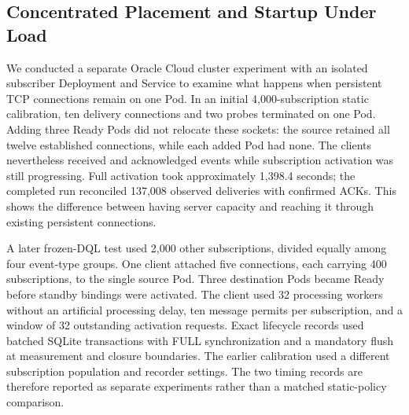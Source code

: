 \subsection{Concentrated Placement and Startup Under Load}
\label{sec:mumbai-startup}

We conducted a separate Oracle Cloud cluster experiment with an isolated subscriber
Deployment and Service to examine what happens when persistent TCP connections remain on one Pod. In an initial 4,000-subscription static calibration, ten delivery
connections and two probes terminated on one Pod. Adding three Ready Pods did
not relocate these sockets: the source retained all twelve established
connections, while each added Pod had none. The clients nevertheless received
and acknowledged events while subscription activation was still progressing.
Full activation took approximately 1,398.4 seconds; the completed run reconciled
137,008 observed deliveries with confirmed ACKs. This shows the difference between having server capacity and reaching it
through existing persistent connections.

A later frozen-DQL test used 2,000 other subscriptions, divided
equally among four event-type groups. One client attached five connections,
each carrying 400 subscriptions, to the single source Pod. Three destination
Pods became Ready before standby bindings were activated. The client used
32 processing workers without an artificial processing delay, ten message
permits per subscription, and a window of 32 outstanding activation requests.
Exact lifecycle records used batched SQLite transactions with FULL
synchronization and a mandatory flush at measurement and closure boundaries.
The earlier calibration used a different subscription population and recorder
settings. The two timing records are therefore reported as separate
experiments rather than a matched static-policy comparison.

